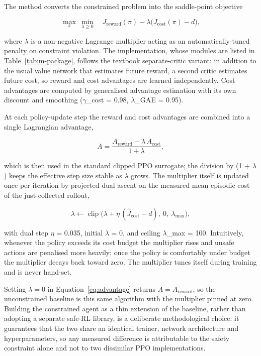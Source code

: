 The method converts the constrained problem into the saddle-point objective

\begin{equation}
  \max_{\pi}\ \min_{\lambda \ge 0}\quad
  J_{\text{reward}}(\pi) - \lambda\bigl(J_{\text{cost}}(\pi) - d\bigr),
  \label{eq:lagrangian}
\end{equation}

where \(\lambda\) is a non-negative Lagrange multiplier acting as an automatically-tuned penalty on constraint
violation. The implementation, whose modules are listed in Table~\ref{tab:m-package}, follows the
textbook separate-critic variant: in
addition to the usual value network that estimates future reward, a second critic estimates future
cost, so reward and cost advantages are learned independently. Cost advantages are computed by
generalised advantage estimation with its own discount and smoothing (\(\gamma\)\_cost = 0.98, \(\lambda\)\_GAE = 0.95).

At each policy-update step the reward and cost advantages are combined into a single Lagrangian
advantage,

\begin{equation}
  A = \frac{A_{\text{reward}} - \lambda\, A_{\text{cost}}}{1 + \lambda},
  \label{eq:advantage}
\end{equation}

which is then used in the standard clipped PPO surrogate; the division by (1 + \(\lambda\)) keeps the effective
step size stable as \(\lambda\) grows. The multiplier itself is updated once per iteration by projected dual
ascent on the measured mean episodic cost of the just-collected rollout,

\begin{equation}
  \lambda \leftarrow \operatorname{clip}\bigl(\lambda + \eta\,(\hat{J}_{\text{cost}} - d),\ 0,\ \lambda_{\max}\bigr),
  \label{eq:dual-update}
\end{equation}

with dual step \(\eta\) = 0.035, initial \(\lambda\) = 0, and ceiling \(\lambda\)\_max = 100. Intuitively, whenever the policy
exceeds its cost budget the multiplier rises and unsafe actions are penalised more heavily; once the
policy is comfortably under budget the multiplier decays back toward zero. The multiplier tunes
itself during training and is never hand-set.

Setting \(\lambda = 0\) in Equation~\ref{eq:advantage} returns \(A = A_{\text{reward}}\), so the
unconstrained baseline is this same algorithm with the multiplier pinned at zero. Building the
constrained agent as a thin extension of the baseline, rather than adopting a separate safe-RL
library, is a deliberate methodological choice: it guarantees that the two share an identical
trainer, network architecture and hyperparameters, so any measured difference is attributable to the
safety constraint alone and not to two dissimilar PPO implementations.

